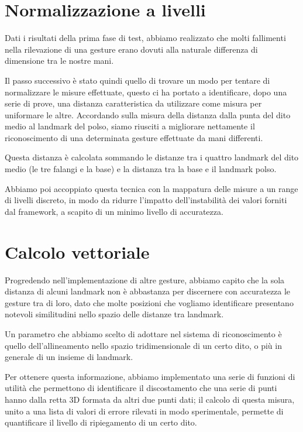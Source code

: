 \section{Normalizzazione a livelli}

Dati i risultati della prima fase di test, abbiamo realizzato che molti fallimenti nella rilevazione di una gesture erano dovuti alla naturale differenza di dimensione tra le nostre mani.

Il passo successivo è stato quindi quello di trovare un modo per tentare di normalizzare le misure effettuate, questo ci ha portato a identificare, dopo una serie di prove, una distanza caratteristica da utilizzare come misura per uniformare le altre. Accordando sulla misura della distanza dalla punta del dito medio al landmark del polso, siamo riusciti a migliorare nettamente il riconoscimento di una determinata gesture effettuate da mani differenti.

Questa distanza è calcolata sommando le distanze tra i quattro landmark del dito medio (le tre falangi e la base) e la distanza tra la base e il landmark polso.

Abbiamo poi accoppiato questa tecnica con la mappatura delle misure a un range di livelli discreto, in modo da ridurre l'impatto dell'instabilità dei valori forniti dal framework, a scapito di un minimo livello di accuratezza.

\section{Calcolo vettoriale}

Progredendo nell'implementazione di altre gesture, abbiamo capito che la sola distanza di alcuni landmark non è abbastanza per discernere con accuratezza le gesture tra di loro, dato che molte posizioni che vogliamo identificare presentano notevoli similitudini nello spazio delle distanze tra landmark.

Un parametro che abbiamo scelto di adottare nel sistema di riconoscimento è quello dell'allineamento nello spazio tridimensionale di un certo dito, o più in generale di un insieme di landmark.

Per ottenere questa informazione, abbiamo implementato una serie di funzioni di utilità che permettono di identificare il discostamento che una serie di punti hanno dalla retta 3D formata da altri due punti dati; il calcolo di questa misura, unito a una lista di valori di errore rilevati in modo sperimentale, permette di quantificare il livello di ripiegamento di un certo dito.

